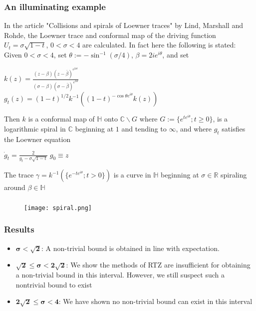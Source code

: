 \documentclass[10pt, compress]{beamer}
\begin{document}
\begin{frame}[fragile]
  \frametitle{An illuminating example}
  \small
In the article "Collisions and spirals of Loewner traces" by Lind, Marshall and Rohde, the Loewner trace and conformal map of the driving function $U_{t} = \sigma\sqrt{1-t}$, $0 < \sigma < 4$ are calculated. In fact here the following is stated:\\

Given $0 < \sigma < 4$, set $\theta := -\sin^{-1}(\sigma/4)$, $\beta = 2ie^{i\theta}$, and set

\begin{center}
$k(z) = \frac{(z-\beta)(z-\bar{\beta})^{e^{2i\theta}}}{(\sigma - \beta)(\sigma - \bar{\beta})^{e^{2i\theta}}}$ \\
$g_{t}(z) = (1-t)^{1/2}k^{-1}((1-t)^{-\cos\theta e^{i\theta}}k(z))$ 
\end{center}

Then $k$ is a conformal map of $\mathbb{H}$ onto $\mathbb{C}\backslash G$ where $ G := \{e^{te^{i\theta}} ; t \geq 0 \}$, is a logarithmic spiral in $\mathbb{C}$ beginning at $1$ and tending to $\infty$, and where $g_{t}$ satisfies the Loewner equation 
\begin{center}
$\displaystyle{\dot g_{t} = \frac{2}{g_{t} - \sigma\sqrt{1-t}} \; g_{0} \equiv z} $
\end{center}
The trace $\gamma = k^{-1}(\{e^{-te^{i\theta}} ; t > 0\})$ is a curve in $\mathbb{H}$ beginning at $\sigma \in \mathbb{R}$ spiraling around $\beta \in \mathbb{H}$

\normalsize
\end{frame}

\begin{frame}[fragile]
  \frametitle{}
\begin{figure}
 \texttt{[image: spiral.png]}
\end{figure}
\end{frame}

\begin{frame}[fragile]
  \frametitle{Results}
\begin{itemize}
\item $\boldsymbol{\sigma<\sqrt{2}}$: A non-trivial bound is obtained in line with expectation. \\

\item $\boldsymbol{\sqrt{2} \leq \sigma < 2\sqrt{2}}$: We show the methods of RTZ are insufficient for obtaining a non-trivial bound in this interval. However, we still suspect such a nontrivial bound to exist\\

\item $\boldsymbol{2\sqrt{2} \leq \sigma < 4}$: We have shown no non-trivial bound can exist in this interval
\end{itemize}
\end{frame}

\end{document}
